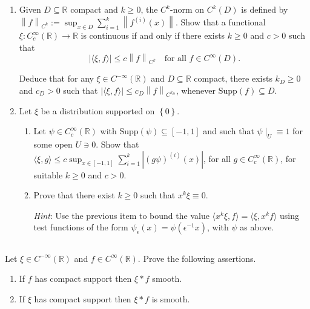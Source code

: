 \documentclass[11pt, reqno,a4paper, twoside]{amsproc}
\newcommand{\supp}{\mathrm{Supp}}
\newcommand{\dbR}{\mathbb R}
\newcommand{\gen}[1]{\langle{#1}\rangle}
\newcommand{\set}[1]{\left\{{#1}\right\}}
\newcommand{\norm}[1]{\left\|#1\right\|}
\newcommand{\abs}[1]{\left|#1\right|}
\begin{document}
\subsection{}
\begin{enumerate}
\item Given $D\subseteq\dbR$ compact and $k\ge 0$, the $C^k$-norm on $C^k(D)$ is defined by $\norm{f}_{C^k}:=\sup_{x\in D}\sum_{i=1}^k \norm{f^{(i)}(x)}$. Show that a functional $\xi:C_c^\infty(\dbR)\to\dbR$ is continuous if and only if there exists $k\ge 0$ and $c>0$ such that \[\abs{\gen{\xi,f}}\le c\norm{f}_{C^k}\quad\text{for all }f\in C^\infty(D).\]

Deduce that for any $\xi\in C^{-\infty}(\dbR)$ and $D\subseteq \dbR$ compact, there exists $k_D\ge 0$ and $c_D>0$ such that $\abs{\gen{\xi,f}}\le c_D\norm{f}_{C^{k_D}}$, whenever $\supp(f)\subseteq D$. 
\item Let $\xi$ be a distribution supported on $\set{0}$. 
\begin{enumerate}
\item Let $\psi\in C_c^{\infty}(\dbR)$ with $\supp(\psi)\subseteq[-1,1]$ and such that $\psi\mid_U\equiv 1$ for some open $U\ni 0$. Show that $\gen{\xi,g}\le c \sup_{x\in [-1,1]}\sum_{i=1}^k\abs{(g\psi)^{(i)}(x)}$, for all $g\in C_c^\infty(\dbR)$, for suitable $k\ge 0$ and $c>0$.
\item Prove that there exist $k\ge 0$ such that $x^k\xi\equiv 0$. 

\textit{Hint}: Use the previous item to bound the value $\gen{x^k\xi,f}=\gen{\xi,x^kf}$ using test functions of the form $\psi_\epsilon(x)=\psi(\epsilon^{-1}x)$, with $\psi$ as above.
\end{enumerate}
\end{enumerate}

\subsection{}Let $\xi\in C^{-\infty}(\dbR)$ and $f\in C^\infty(\dbR)$. Prove the following assertions.
\begin{enumerate}
\item If $f$ has compact support then $\xi\ast f$ smooth.
\item If $\xi$ has compact support then $\xi\ast f$ is smooth.
\end{enumerate}

\end{document}
